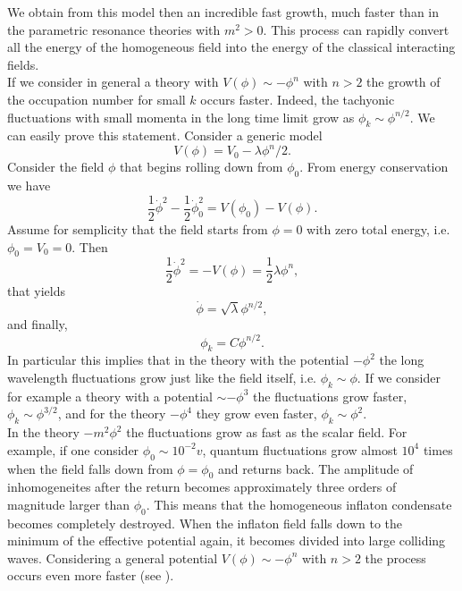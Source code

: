 \documentclass[11pt,a4paper,twoside]{book}
\begin{document}
We obtain from this model then an incredible fast growth, much faster than in the parametric resonance theories with $ m^{2} > 0 $. This process  can rapidly convert all the energy of the homogeneous field into the energy of the classical interacting fields.\\
If we consider in general a theory with $ V(\phi) \sim -\phi^{n} $ with $ n > 2 $ the growth of the occupation number for small $ k $ occurs faster. Indeed, the tachyonic fluctuations with small momenta in the long time limit grow as $\phi_{k} \sim \phi^{n/2}$. 
We can easily prove this statement. Consider a generic model
\begin{equation}
\label{Chap5:PotentialGeneric}
V(\phi)=V_{0}-\lambda\phi^{n}/2.
\end{equation}
Consider the field $\phi$ that begins rolling down from $\phi_{0}$. From energy conservation we have 
\begin{equation}
\label{Chao5:energyConservation}
\frac{1}{2}\dot{\phi}^{2} - \frac{1}{2}\dot{\phi}^{2}_{0} = V(\phi_{0}) - V(\phi).
\end{equation}
 Assume for semplicity that the field starts from $ \phi=0 $ with zero total energy, i.e. $ \phi_{0}=V_{0}=0 $. Then 
 \begin{equation}
\label{Chap5:equationFieldFluctuation}
\frac{1}{2}\dot{\phi}^{2}=-V(\phi) = \frac{1}{2} \lambda\phi^{n},
 \end{equation}
that yields
\begin{equation}
\dot{\phi}=\sqrt{\lambda}\phi^{n/2},
\end{equation}
and finally,
\begin{equation}
\label{Chap5:dependenceFluctuationPotential}
\phi_{k}=C\phi^{n/2}.
\end{equation}
In particular this implies that in the theory with the potential 
$ -\phi^{2} $ the long wavelength fluctuations grow just like the field itself, i.e. $ \phi_{k} \sim \phi $. If we consider for example a theory with a potential $\sim -\phi^{3} $ the fluctuations grow faster, $ \phi_{k} \sim \phi^{3/2} $, and for the theory $ -\phi^{4} $ they grow even faster, $ \phi_{k} \sim \phi^{2} $.\\
In the theory $ -m^{2}\phi^{2}$ the fluctuations grow as fast as the scalar field. For example, if one consider $ \phi_{0} \sim 10^{-2}v $, quantum fluctuations grow almost $ 10^{4} $ times when the field falls down from $ \phi=\phi_{0} $ and returns back. The amplitude of inhomogeneites after the return becomes approximately three orders of magnitude larger than $\phi_{0}$. This means that the homogeneous inflaton condensate becomes completely destroyed. When the inflaton field falls down to the minimum of the effective potential again, it becomes divided into large colliding waves. Considering a general potential  $V(\phi) \sim -\phi^{n} $ with $ n>2 $ the process occurs even more faster (see \cite{Chap5:TachyonicInstability}).
\end{document}
